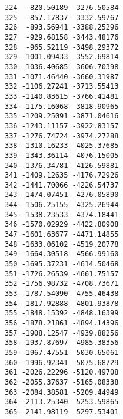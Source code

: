 \documentclass[11pt]{article}
\begin{document}
\begin{Verbatim}[commandchars=\\\{\}]
324  -820.50189 -3276.50584
325  -857.17837 -3332.59767
326  -893.56941 -3388.25296
327  -929.68158 -3443.48176
328  -965.52119 -3498.29372
329 -1001.09433 -3552.69814
330 -1036.40685 -3606.70398
331 -1071.46440 -3660.31987
332 -1106.27241 -3713.55413
333 -1140.83615 -3766.41481
334 -1175.16068 -3818.90965
335 -1209.25091 -3871.04616
336 -1243.11157 -3922.83157
337 -1276.74724 -3974.27288
338 -1310.16233 -4025.37685
339 -1343.36114 -4076.15005
340 -1376.34781 -4126.59881
341 -1409.12635 -4176.72926
342 -1441.70066 -4226.54737
343 -1474.07451 -4276.05890
344 -1506.25155 -4325.26944
345 -1538.23533 -4374.18441
346 -1570.02929 -4422.80908
347 -1601.63677 -4471.14855
348 -1633.06102 -4519.20778
349 -1664.30518 -4566.99160
350 -1695.37231 -4614.50468
351 -1726.26539 -4661.75157
352 -1756.98732 -4708.73671
353 -1787.54090 -4755.46438
354 -1817.92888 -4801.93878
355 -1848.15392 -4848.16399
356 -1878.21861 -4894.14396
357 -1908.12547 -4939.88256
358 -1937.87697 -4985.38356
359 -1967.47551 -5030.65061
360 -1996.92341 -5075.68729
361 -2026.22296 -5120.49708
362 -2055.37637 -5165.08338
363 -2084.38581 -5209.44949
364 -2113.25340 -5253.59865
365 -2141.98119 -5297.53401


\end{Verbatim}
\end{document}
